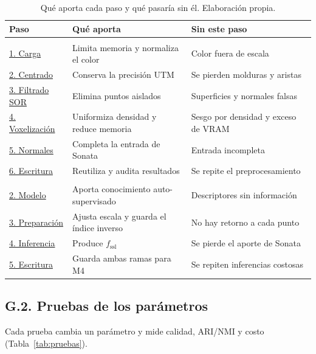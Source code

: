 \begin{table}[H]
\centering
{}
\caption[Qué aporta cada paso y qué pasaría sin él]{Qué aporta cada paso y qué pasaría sin él. Elaboración propia.}
\label{tab:funcion}
\begin{tabularx}{\linewidth}{@{}>{\raggedright\arraybackslash\hsize=0.6\hsize}X>{\raggedright\arraybackslash\hsize=1.2\hsize}X>{\raggedright\arraybackslash\hsize=1.2\hsize}X@{}}
\toprule
\textbf{Paso} & \textbf{Qué aporta} & \textbf{Sin este paso} \\
\midrule
\multicolumn{3}{@{}l}{\textit{Unidad 1}}\\
\hyperref[sec:u1-p1]{1. Carga} & Limita memoria y normaliza el color & Color fuera de escala \\
\hyperref[sec:u1-p2]{2. Centrado} & Conserva la precisión UTM & Se pierden molduras y aristas \\
\hyperref[sec:u1-p3]{3. Filtrado SOR} & Elimina puntos aislados & Superficies y normales falsas \\
\hyperref[sec:u1-p4]{4. Voxelización} & Uniformiza densidad y reduce memoria & Sesgo por densidad y exceso de VRAM \\
\hyperref[sec:u1-p5]{5. Normales} & Completa la entrada de Sonata & Entrada incompleta \\
\hyperref[sec:u1-p6]{6. Escritura} & Reutiliza y audita resultados & Se repite el preprocesamiento \\
\midrule
\multicolumn{3}{@{}l}{\textit{Unidad 2}}\\
\hyperref[sec:u2-p2]{2. Modelo} & Aporta conocimiento auto-supervisado & Descriptores sin información \\
\hyperref[sec:u2-p3]{3. Preparación} & Ajusta escala y guarda el índice inverso & No hay retorno a cada punto \\
\hyperref[sec:u2-p4]{4. Inferencia} & Produce $f_{\mathrm{ssl}}$ & Se pierde el aporte de Sonata \\
\hyperref[sec:u2-p5]{5. Escritura} & Guarda ambas ramas para M4 & Se repiten inferencias costosas \\
\bottomrule
\end{tabularx}
\end{table}


\subsection*{G.2. Pruebas de los parámetros}


Cada prueba cambia un parámetro y mide calidad, ARI/NMI y costo
(Tabla~\ref{tab:pruebas}).

